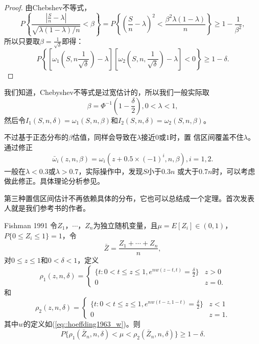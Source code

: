 \begin{proof}
  由Chebshev不等式，
  \begin{equation}
    P\left\{\frac{\left|\frac{S}{n} - \lambda\right|}{\sqrt{\lambda(1
        - \lambda)/n}} < \beta\right\} = P\left\{(\frac{S}{n} -
    \lambda)^2 < \frac{\beta^2 \lambda (1 - \lambda)}{n}\right\} \geq
    1 -\frac{1}{\beta^2},
    \label{eq::proof_conf_int2}
  \end{equation}
  所以只要取$\beta = \frac{1}{\sqrt{\delta}}$即得：
  \begin{equation}
    P\left\{\left[\omega_1(S, n \frac{1}{\sqrt{\delta}}) -
      \lambda\right]\left[\omega_2(S, n, \frac{1}{\sqrt{\delta}}) -
      \lambda\right] < 0\right\} \geq 1 - \delta.
  \end{equation}
\end{proof}

我们知道，Chebyshev不等式是过宽估计的，所以我们一般实际取
$$
\beta = \Phi^{-1}(1 - \frac{\delta}{2}), 0 < \lambda < 1,
$$
然后令$I_1(S, n, \delta) = \omega_1(S, n, \beta)$和$I_2(S, n,
\delta) = \omega_2(S, n, \beta)$。

不过基于正态分布的$\beta$估值，同样会导致在$\lambda$接近$0$或$1$时，置
信区间覆盖不住$\lambda$。通过修正
\begin{equation}
  \bar{\omega}_i(z, n, \beta) = \omega_i(z + 0.5 \times (-1)^i, n,
  \beta), i = 1, 2.
  \label{eq::con_corr}
\end{equation}
一般在$\lambda < 0.3$或$\lambda > 0.7$，实际操作中，发现$S$小于$0.3n$
或大于$0.7n$时，可以考虑做此修正。具体理论分析参见\cite{Blyth1983Binomial}。

第三种置信区间估计不再依赖具体的分布，它也可以总结成一个定理。首次发表
人就是我们参考书的作者。

\begin{theorem}{\hei Fishman 1991}
  令$Z_1$，$\cdots$，$Z_n$为独立随机变量，且$\mu = E[Z_i] \in (0, 1)$，
  $P\{0 \leq Z_i \leq 1\} = 1$，令
  $$
  \bar{Z} = \frac{Z_1 + \cdots + Z_n}{n},
  $$
  对$0 \leq z \leq 1$和$0 < \delta < 1$，定义
  \begin{equation}
    \rho_1(z, n, \delta) = \left\{ \begin{array}{ll}
      \{t : 0 < t \leq z \leq 1, e^{n w(z - t, t)} = \frac{\delta}{2} \}& z > 0\\
      0 & z = 0.
      \end{array}
      \right.
      \label{eq::conf_int3_rho_1}
    \end{equation}
    和
    \begin{equation}
      \rho_2(z, n, \delta) = \left\{ \begin{array}{ll}
      \{t : 0 < t \leq z \leq 1, e^{n w(t - z, 1 - t)} = \frac{\delta}{2} \}& z < 1\\
      0 & z = 1.
      \end{array}
      \right.
      \label{eq::conf_int3_rho_1}
      \end{equation}
      其中$w$的定义如(\ref{eq::hoeffding1963_w})。则
      $$
      P\{\rho_1(\bar{Z}_n, n, \delta) < \mu < \rho_2(\bar{Z}_n, n, \delta)\} \geq 1 - \delta.
      $$
    \label{thm::conf_int3}
\end{theorem}

